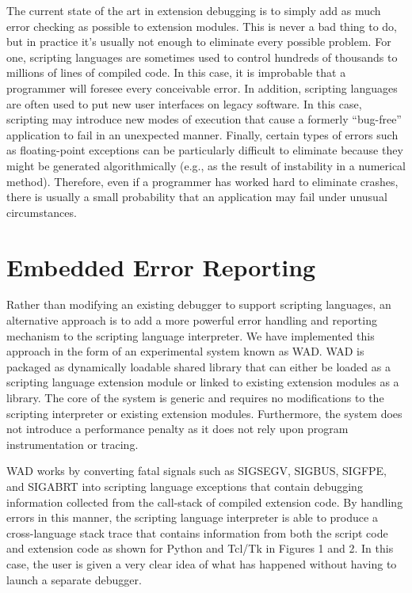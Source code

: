 The current state of the art in extension debugging is to simply add
as much error checking as possible to extension modules. This is never
a bad thing to do, but in practice it's usually not enough to
eliminate every possible problem.  For one, scripting languages are
sometimes used to control hundreds of thousands to millions of lines
of compiled code.  In this case, it is improbable that a programmer will
foresee every conceivable error.  In addition, scripting languages are
often used to put new user interfaces on legacy software. In this
case, scripting may introduce new modes of execution that cause a
formerly ``bug-free'' application to fail in an unexpected manner.
Finally, certain types of errors such as floating-point exceptions can
be particularly difficult to eliminate because they might be generated
algorithmically (e.g., as the result of instability in a numerical
method). Therefore, even if a programmer has worked hard to eliminate
crashes, there is usually a small probability that an application may
fail under unusual circumstances.

\section{Embedded Error Reporting}

Rather than modifying an existing debugger to support scripting
languages, an alternative approach is to add a more powerful error
handling and reporting mechanism to the scripting language
interpreter.  We have implemented this approach in the form of an
experimental system known as WAD.  WAD is packaged as dynamically
loadable shared library that can either be loaded as a scripting
language extension module or linked to existing extension modules as a
library.  The core of the system is generic and requires no
modifications to the scripting interpreter or existing extension
modules.  Furthermore, the system does not introduce a performance
penalty as it does not rely upon program instrumentation or tracing.

WAD works by converting fatal signals such as SIGSEGV,
SIGBUS, SIGFPE, and SIGABRT into scripting language exceptions that contain
debugging information collected from the call-stack of compiled
extension code.  By handling errors in this manner, the scripting
language interpreter is able to produce a cross-language stack trace that
contains information from both the script code and extension code as
shown for Python and Tcl/Tk in Figures 1 and 2.  In this case, the user
is given a very clear idea of what has happened without having
to launch a separate debugger. 

